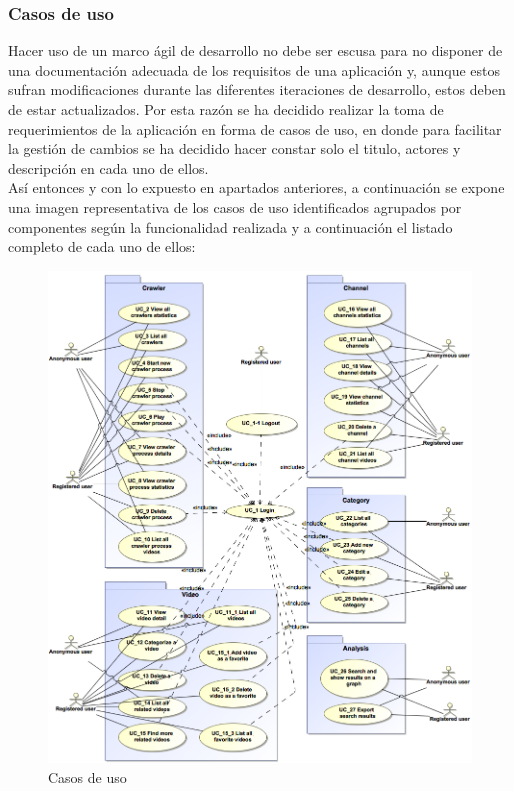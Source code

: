 \documentclass[11pt,a4paper]{article}
\begin{document}
\subsubsection{Casos de uso}
Hacer uso de un marco ágil de desarrollo no debe ser escusa para no disponer de una documentación adecuada de los requisitos de una aplicación y, aunque estos sufran modificaciones durante las diferentes iteraciones de desarrollo, estos deben de estar actualizados. Por esta razón se ha decidido realizar la toma de requerimientos de la aplicación en forma de casos de uso, en donde para facilitar la gestión de cambios se ha decidido hacer constar solo el titulo, actores y descripción en cada uno de ellos.
\\

Así entonces y con lo expuesto en apartados anteriores, a continuación se expone una imagen representativa de los casos de uso identificados agrupados por componentes según la funcionalidad realizada y a continuación el listado completo de cada uno de ellos:

\begin{figure}[H]
\centering
\includegraphics[scale=0.35]{requisitos/UseCases.png}
\caption{Casos de uso}
\end{figure}
\medskip 
\medskip 
\end{document}

